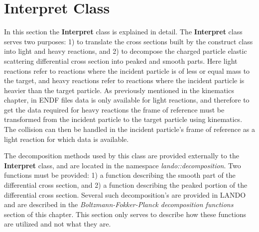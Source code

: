 \documentclass[../main.tex]{subfiles}
\begin{document}

\section{Interpret Class}
In this section the \textbf{Interpret} class is explained in detail. The \textbf{Interpret} class serves two purposes: 1) to translate the cross sections built by the construct class into light and heavy reactions, and 2) to decompose the charged particle elastic scattering differential cross section into peaked and smooth parts. Here light reactions refer to reactions where the incident particle is of less or equal mass to the target, and heavy reactions refer to reactions where the incident particle is heavier than the target particle. As previously mentioned in the kinematics chapter, in ENDF files data is only available for light reactions, and therefore to get the data required for heavy reactions the frame of reference must be transformed from the incident particle to the target particle using kinematics. The collision can then be handled in the incident particle's frame of reference as a light reaction for which data is available.

The decomposition methods used by this class are provided externally to the \textbf{Interpret} class, and are located in the namespace \emph{lando::decomposition}. Two functions must be provided: 1) a function describing the smooth part of the differential cross section, and 2) a function describing the peaked portion of the differential cross section. Several such decomposition's are provided in LANDO and are described in the \emph{Boltzmann-Fokker-Planck decomposition functions} section of this chapter. This section only serves to describe how these functions are utilized and not what they are.
\end{document}
